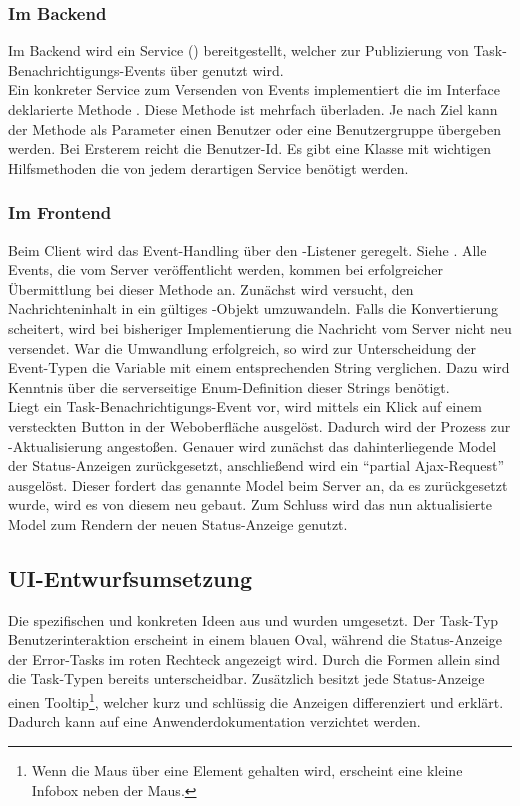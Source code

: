 \subsubsection{Im Backend}
\label{subsub:Backend}
Im Backend wird ein Service () bereitgestellt, welcher zur Publizierung von
Task-Benachrichtigungs-Events über  genutzt wird.\\
Ein konkreter Service zum Versenden von Events implementiert die im Interface  deklarierte Methode
. Diese Methode ist mehrfach überladen. Je nach Ziel kann der Methode als Parameter einen Benutzer
oder eine Benutzergruppe übergeben werden. Bei Ersterem reicht die Benutzer-Id. Es gibt eine 
Klasse mit wichtigen Hilfsmethoden die von jedem derartigen Service benötigt werden.

\subsubsection{Im Frontend}
\label{subsub:Frontend}
Beim Client wird das Event-Handling über den -Listener geregelt. Siehe . Alle Events, die
vom Server veröffentlicht werden, kommen bei erfolgreicher Übermittlung bei dieser Methode an. Zunächst wird versucht, den
Nachrichteninhalt in ein gültiges -Objekt umzuwandeln. Falls die Konvertierung scheitert, wird bei bisheriger
Implementierung die Nachricht vom Server nicht neu versendet. War die Umwandlung erfolgreich, so wird zur Unterscheidung der
Event-Typen die Variable  mit einem entsprechenden String verglichen. Dazu wird Kenntnis über die serverseitige
Enum-Definition dieser Strings benötigt.\\
Liegt ein Task-Benachrichtigungs-Event vor, wird mittels  ein Klick auf einem versteckten Button in der
Weboberfläche ausgelöst. Dadurch wird der Prozess zur -Aktualisierung angestoßen. Genauer wird zunächst das
dahinterliegende Model der Status-Anzeigen zurückgesetzt, anschließend wird ein "`partial Ajax-Request"' ausgelöst. Dieser fordert
das genannte Model beim Server an, da es zurückgesetzt wurde, wird es von diesem neu gebaut. Zum Schluss wird das nun
aktualisierte Model zum Rendern der neuen Status-Anzeige genutzt.

\subsection{UI-Entwurfsumsetzung}
\label{sub:UI-Entwurfsumsetzung}
Die spezifischen und konkreten Ideen aus  und  wurden umgesetzt. Der
Task-Typ Benutzerinteraktion erscheint in einem blauen Oval, während die Status-Anzeige der Error-Tasks im roten Rechteck
angezeigt wird. Durch die Formen allein sind die Task-Typen bereits unterscheidbar. Zusätzlich besitzt jede Status-Anzeige einen
\sog Tooltip\footnote{Wenn die Maus über eine Element gehalten wird, erscheint eine kleine Infobox neben der Maus.}, welcher kurz
und schlüssig die Anzeigen differenziert und erklärt. Dadurch kann auf eine Anwenderdokumentation verzichtet werden.

